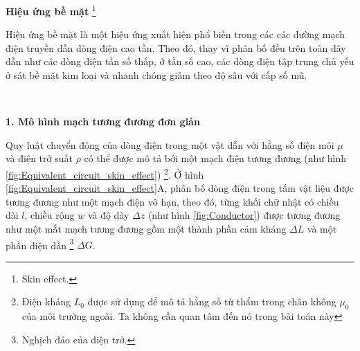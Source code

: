 











\textbf{Hiệu ứng bề mặt} \footnote{Skin effect.}

Hiệu ứng bề mặt là một hiệu ứng xuất hiện phổ biến trong các các đường mạch điện truyền dẫn dòng điện cao tần. Theo đó, thay vì phân bố đều trên toàn dây dẫn như các dòng điện tần số thấp, ở tần số cao, các dòng điện tập trung chủ yếu ở sát bề mặt kim loại và nhanh chóng giảm theo độ sâu với cấp số mũ.

\ \

\textbf{1. Mô hình mạch tương đương đơn giản}

Quy luật chuyển động của dòng điện trong một vật dẫn với hằng số điện môi \(\mu\) và điện trở suất \(\rho\) có thể được mô tả bởi một mạch điện tương đương (như hình \ref{fig:Equivalent_circuit_skin_effect}) \footnote{Điện kháng \(L_0\) được sử dụng để mô tả hằng số từ thẩm trong chân không \(\mu_0\) của môi trường ngoài. Ta không cần quan tâm đến nó trong bài toán này}. Ở hình \ref{fig:Equivalent_circuit_skin_effect}A, phân bố dòng điện trong tấm vật liệu được tương đương như một mạch điện vô hạn, theo đó, từng khối chữ nhật có chiều dài \(l\), chiều rộng \(w\) và độ dày \(\Delta z\) (như hình \ref{fig:Conductor}) được tương đương như một mắt mạch tương đương gồm một thành phần cảm kháng \(\Delta L\) và một phần điện dẫn \footnote{Nghịch đảo của điện trở.} \( \Delta G \).

